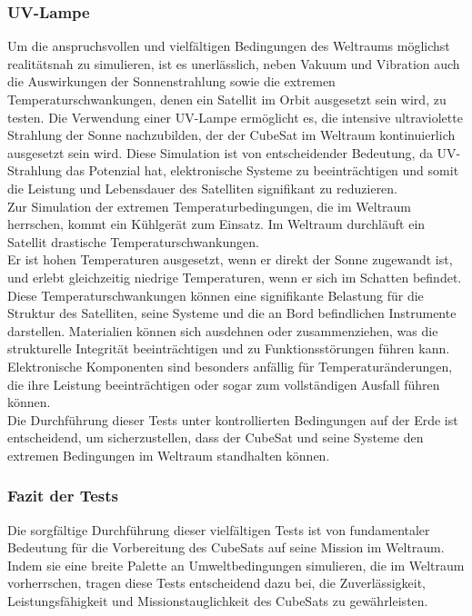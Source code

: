 \subsubsection{UV-Lampe}
Um die anspruchsvollen und vielfältigen Bedingungen des Weltraums möglichst realitätsnah zu simulieren, ist es unerlässlich, neben Vakuum und Vibration auch die Auswirkungen der Sonnenstrahlung sowie die extremen Temperaturschwankungen, denen ein Satellit im Orbit ausgesetzt sein wird, zu testen. Die Verwendung einer UV-Lampe ermöglicht es, die intensive ultraviolette Strahlung der Sonne nachzubilden, der der CubeSat im Weltraum kontinuierlich ausgesetzt sein wird. Diese Simulation ist von entscheidender Bedeutung, da UV-Strahlung das Potenzial hat, elektronische Systeme zu beeinträchtigen und somit die Leistung und Lebensdauer des Satelliten signifikant zu reduzieren.\\
\vspace{2mm}
Zur Simulation der extremen Temperaturbedingungen, die im Weltraum herrschen, kommt ein Kühlgerät zum Einsatz. Im Weltraum durchläuft ein Satellit drastische Temperaturschwankungen. \\
\vspace{2mm}
Er ist hohen Temperaturen ausgesetzt, wenn er direkt der Sonne zugewandt ist, und erlebt gleichzeitig niedrige Temperaturen, wenn er sich im Schatten befindet. Diese Temperaturschwankungen können eine signifikante Belastung für die Struktur des Satelliten, seine Systeme und die an Bord befindlichen Instrumente darstellen. Materialien können sich ausdehnen oder zusammenziehen, was die strukturelle Integrität beeinträchtigen und zu Funktionsstörungen führen kann. Elektronische Komponenten sind besonders anfällig für Temperaturänderungen, die ihre Leistung beeinträchtigen oder sogar zum vollständigen Ausfall führen können.\\
\vspace{2mm}
Die Durchführung dieser Tests unter kontrollierten Bedingungen auf der Erde ist entscheidend, um sicherzustellen, dass der CubeSat und seine Systeme den extremen Bedingungen im Weltraum standhalten können.


\subsubsection{Fazit der Tests}
Die sorgfältige Durchführung dieser vielfältigen Tests ist von fundamentaler Bedeutung für die Vorbereitung des CubeSats auf seine Mission im Weltraum. Indem sie eine breite Palette an Umweltbedingungen simulieren, die im Weltraum vorherrschen, tragen diese Tests entscheidend dazu bei, die Zuverlässigkeit, Leistungsfähigkeit und Missionstauglichkeit des CubeSats zu gewährleisten.

